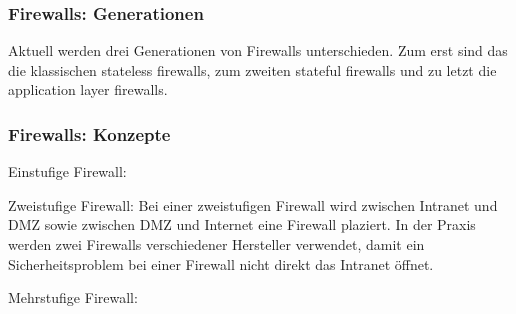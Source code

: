 \subsubsection{Firewalls: Generationen}

Aktuell werden drei Generationen von Firewalls unterschieden. Zum erst sind das die klassischen stateless firewalls, zum zweiten stateful firewalls und zu letzt die application layer firewalls.

\subsubsection{Firewalls: Konzepte}

Einstufige Firewall:

Zweistufige Firewall: Bei einer zweistufigen Firewall wird zwischen Intranet und DMZ sowie zwischen DMZ und Internet eine Firewall plaziert. In der Praxis werden zwei Firewalls verschiedener Hersteller verwendet, damit ein Sicherheitsproblem bei einer Firewall nicht direkt das Intranet öffnet.

Mehrstufige Firewall:
